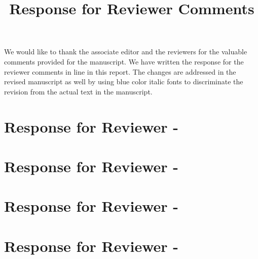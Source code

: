 \documentclass[10pt,letterpaper,onecolumn]{IEEEtran}
\begin{document}
\doublespacing

\title{Response for Reviewer Comments}

\maketitle

We would like to thank the associate editor and the reviewers for the valuable comments provided for the manuscript. We have written the response for the reviewer comments in line in this report. The changes are addressed in the revised manuscript as well by using blue color italic fonts to discriminate the revision from the actual text in the manuscript. 

\newpage
\section*{Response for Reviewer - }


\newpage
\section*{Response for Reviewer - }


\newpage
\section*{Response for Reviewer - }


\newpage
\section*{Response for Reviewer - }

\end{document}
